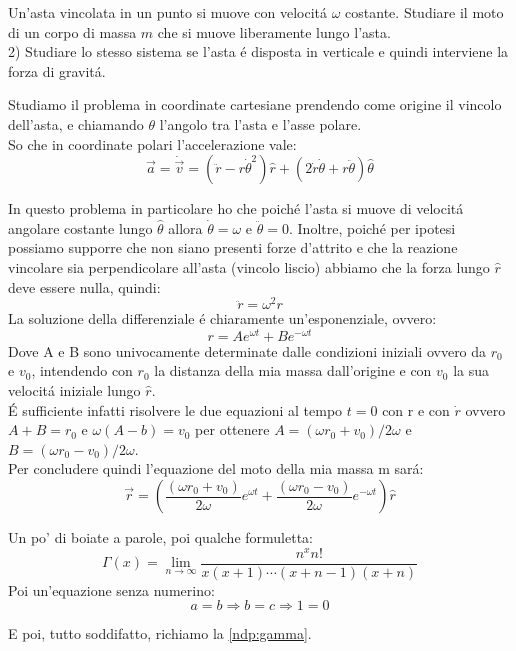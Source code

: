 \documentclass[../main.tex]{subfiles}
\begin{document}

\textex
Un'asta vincolata in un punto si muove con velocit\'{a} $\omega$ costante. Studiare il moto di un corpo di massa $m$ che si muove liberamente lungo l'asta. \\
2) Studiare lo stesso sistema se l'asta \'{e} disposta in verticale e quindi interviene la forza di gravit\'{a}.

\solution
Studiamo il problema in coordinate cartesiane prendendo come origine il vincolo dell'asta, e chiamando $\theta$ l'angolo tra l'asta e l'asse polare. \\
So che in coordinate polari l'accelerazione vale: 
\begin{equation}\label{AV1}
	\overrightarrow{a}=\dot{\overrightarrow{v}} =(\ddot{r}-r\dot{\theta}^2)\hat{r}+(2\dot{r}\dot{\theta}+r\ddot{\theta})\hat{\theta}
\end{equation}

In questo problema in particolare ho che poich\'{e} l'asta si muove di velocit\'{a} angolare costante lungo  $\hat{\theta}$ allora
 $\dot{\theta}=\omega$ e $\ddot{\theta}=0$. Inoltre, poich\'{e} per ipotesi possiamo supporre che non siano presenti forze d'attrito e che la reazione vincolare sia 
 perpendicolare all'asta (vincolo liscio) abbiamo che la forza lungo $\hat{r}$ deve essere nulla, quindi:
 \begin{equation}\label{AV2}
  \ddot{r}=\omega^2r
 \end{equation}
La soluzione della differenziale \'{e} chiaramente un'esponenziale, ovvero:
\begin{equation}\label{AV3}
 r=Ae^{\omega t}+Be^{-\omega t}
\end{equation}
Dove A e B sono univocamente determinate dalle condizioni iniziali ovvero da $r_0$ e $v_0$, intendendo con $r_0$ la distanza della mia massa dall'origine
e con $v_0$ la sua velocit\'{a} iniziale lungo $\hat{r}$. \\
\'{E} sufficiente infatti risolvere le due equazioni al tempo $t=0$ con r e con $\dot{r}$ ovvero $A+B=r_0$ e $\omega(A-b)=v_0$ per ottenere $A={(\omega r_0 +
v_0)}/{2\omega}$ e $B={(\omega r_0 -v_0)}/{2\omega}$.\\
Per concludere quindi l'equazione del moto della mia massa m sar\'{a}:
\begin{equation}
 \overrightarrow{r}=(\frac{(\omega r_0 +v_0)}{2\omega}e^{\omega t}+\frac{(\omega r_0 -v_0)}{2\omega}e^{-\omega t})\hat{r}
\end{equation}




Un po' di boiate a parole, poi qualche formuletta:
\begin{equation}\label{ndp:gamma}
	\Gamma(x)=\lim_{n\to\infty} \dfrac{n^xn!}{x(x+1)\cdots (x+n-1)(x+n)}
\end{equation}
Poi un'equazione senza numerino:
\begin{equation*}
	a=b \Rightarrow b=c \Rightarrow 1=0
\end{equation*}

E poi, tutto soddifatto, richiamo la \cref{ndp:gamma}.
\end{document}

